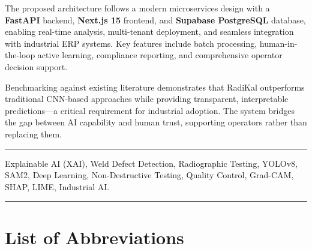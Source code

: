 \documentclass[12pt,a4paper]{report}
\begin{document}
The proposed architecture follows a modern microservices design with a \textbf{FastAPI} backend, \textbf{Next.js 15} frontend, and \textbf{Supabase PostgreSQL} database, enabling real-time analysis, multi-tenant deployment, and seamless integration with industrial ERP systems. Key features include batch processing, human-in-the-loop active learning, compliance reporting, and comprehensive operator decision support.

Benchmarking against existing literature demonstrates that RadiKal outperforms traditional CNN-based approaches while providing transparent, interpretable predictions---a critical requirement for industrial adoption. The system bridges the gap between AI capability and human trust, supporting operators rather than replacing them.

\vspace{0.5cm}
\noindent\rule{\linewidth}{0.4pt}
\vspace{0.3cm}
 Explainable AI (XAI), Weld Defect Detection, Radiographic Testing, YOLOv8, SAM2, Deep Learning, Non-Destructive Testing, Quality Control, Grad-CAM, SHAP, LIME, Industrial AI.

\vspace{0.5cm}
\noindent\rule{\linewidth}{0.4pt}

\chapter*{List of Abbreviations}
\end{document}

